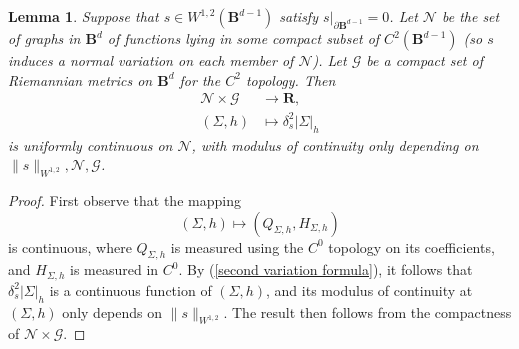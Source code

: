 \documentclass[reqno,11pt]{amsart}
\newcommand{\RR}{\mathbf{R}}
\newcommand{\Ball}{\mathbf{B}}
\newtheorem{lemma}[theorem]{Lemma}
\theoremstyle{definition}
\numberwithin{equation}{section}
\begin{document}
\begin{lemma}\label{uniform continuity of stability}
Suppose that $s \in W^{1, 2}(\Ball^{d - 1})$ satisfy $s|_{\partial \Ball^{d - 1}} = 0$.
Let $\mathscr N$ be the set of graphs in $\Ball^d$ of functions lying in some compact subset of $C^2(\Ball^{d - 1})$ (so $s$ induces a normal variation on each member of $\mathscr N$).
Let $\mathscr G$ be a compact set of Riemannian metrics on $\Ball^d$ for the $C^2$ topology.
Then
\begin{align*}
\mathscr N \times \mathscr G &\to \RR, \\
(\Sigma, h) &\mapsto \delta^2_s |\Sigma|_h
\end{align*}
is uniformly continuous on $\mathscr N$, with modulus of continuity only depending on $\|s\|_{W^{1, 2}}, \mathscr N, \mathscr G$.
\end{lemma}
\begin{proof}
First observe that the mapping
\begin{equation}\label{stability curvature map}
(\Sigma, h) \mapsto (Q_{\Sigma, h}, H_{\Sigma, h})
\end{equation}
is continuous, where $Q_{\Sigma, h}$ is measured using the $C^0$ topology on its coefficients, and $H_{\Sigma, h}$ is measured in $C^0$.
By (\ref{second variation formula}), it follows that $\delta^2_s |\Sigma|_h$ is a continuous function of $(\Sigma, h)$, and its modulus of continuity at $(\Sigma, h)$ only depends on $\|s\|_{W^{1, 2}}$.
The result then follows from the compactness of $\mathscr N \times \mathscr G$.
\end{proof}
\end{document}
